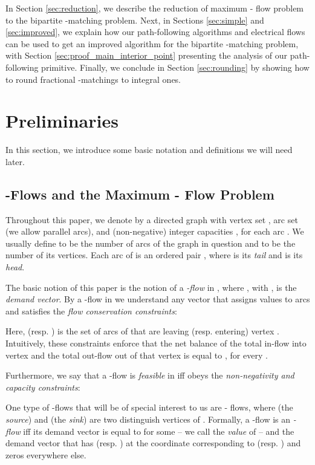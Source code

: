 \documentclass[11pt, letterpaper]{article}
\begin{document}
In Section \ref{sec:reduction}, we describe the reduction of maximum - flow problem to the bipartite -matching problem. Next, in Sections \ref{sec:simple} and \ref{sec:improved}, we explain how our path-following algorithms and electrical flows can be used to get an improved algorithm for the bipartite -matching problem, with Section \ref{sec:proof_main_interior_point} presenting the analysis of our path-following primitive. Finally, we conclude in Section \ref{sec:rounding} by showing how to round fractional -matchings to integral ones.  \section{Preliminaries}\label{sec:preliminaries}

In this section, we introduce some basic notation and definitions we will need later. 

\subsection{\texorpdfstring{-Flows}{Sigma-Flows} and the Maximum - Flow Problem}



Throughout this paper, we denote by  a directed graph with vertex set , arc set  (we allow parallel arcs), and (non-negative) integer capacities , for each arc . We usually define  to be the number of arcs of the graph in question and  to be the number of its vertices. Each arc  of  is an ordered pair , where  is its {\em tail} and  is its {\em head}.

The basic notion of this paper is the notion of a {\em -flow} in , where , with , is the {\em demand vector}. By a -flow in  we understand any vector  that assigns values to arcs  and satisfies the {\em flow conservation constraints}:
 
Here,  (resp. ) is the set of arcs of  that are leaving (resp. entering) vertex . Intuitively, these constraints enforce that the net balance of the total in-flow into vertex  and  the total out-flow out of that vertex is equal to , for every . 

Furthermore, we say that a -flow  is {\em feasible} in  iff  obeys the {\em non-negativity and capacity constraints}:
 

One type of -flows that will be of special interest to us are - flows, where  (the {\em source}) and  (the {\em sink}) are two distinguish vertices of . Formally, a -flow  is an {\em - flow} iff its demand vector  is equal to  for some  -- we call  the {\em value} of  -- and the demand vector  that has  (resp. ) at the coordinate corresponding to  (resp. ) and zeros everywhere else. 
\end{document}
